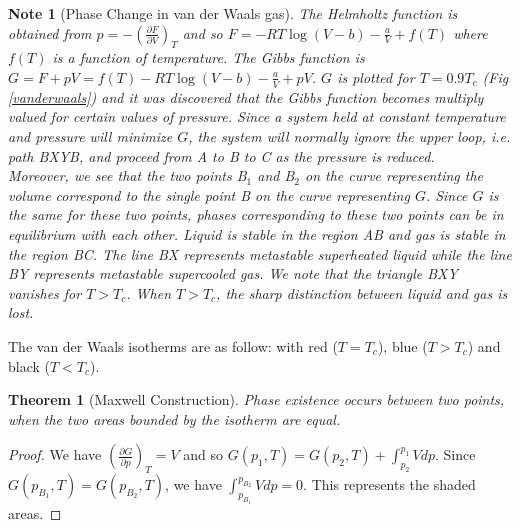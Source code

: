 \documentclass[a4paper]{article}
\newtheorem{Note}{Note}[section]
\theoremstyle{new}
\newtheorem{thm}{Theorem}[section]
\begin{document}
\newpage
\begin{Note}[Phase Change in van der Waals gas]
The Helmholtz function is obtained from $p=-(\frac{\partial F}{\partial V})_T$ and so $F=-RT\log(V-b)-\frac{a}{V}+f(T)$ where $f(T)$ is a function of temperature. The Gibbs function is $G=F+pV=f(T)-RT\log(V-b)-\frac{a}{V}+pV$. $G$ is plotted for $T=0.9T_c$ (Fig \ref{vanderwaals}) and it was discovered that the Gibbs function becomes multiply valued for certain values of pressure. Since a system held at constant temperature and pressure will minimize $G$, the system will normally ignore the upper loop, i.e. path BXYB, and proceed from A to B to C as the pressure is reduced.\\[5pt]
Moreover, we see that the two points B$_1$ and B$_2$ on the curve representing the volume correspond to the single point B on the curve representing $G$. Since $G$ is the same for these two points, phases corresponding to these two points can be in equilibrium with each other. Liquid is stable in the region AB and gas is stable in the region BC. The line BX represents metastable superheated liquid while the line BY represents metastable supercooled gas. We note that the triangle BXY vanishes for $T>T_c$. When $T>T_c$, the sharp distinction between liquid and gas is lost.
\end{Note}
The van der Waals isotherms are as follow: with red ($T=T_c$), blue ($T>T_c$) and black ($T<T_c$).
\begin{center}
\end{center}
\begin{thm}[Maxwell Construction]
Phase existence occurs between two points, when the two areas bounded by the isotherm are equal.
\end{thm}
\begin{proof}
We have $(\frac{\partial G}{\partial p})_T=V$ and so $G(p_1,T)=G(p_2,T)+\int_{p_2}^{p_1}Vdp$. Since $G(p_{B_1},T)=G(p_{B_2},T)$, we have $\int_{p_{B_1}}^{p_{B_2}}Vdp=0$. This represents the shaded areas.
\end{proof}
\end{document}

